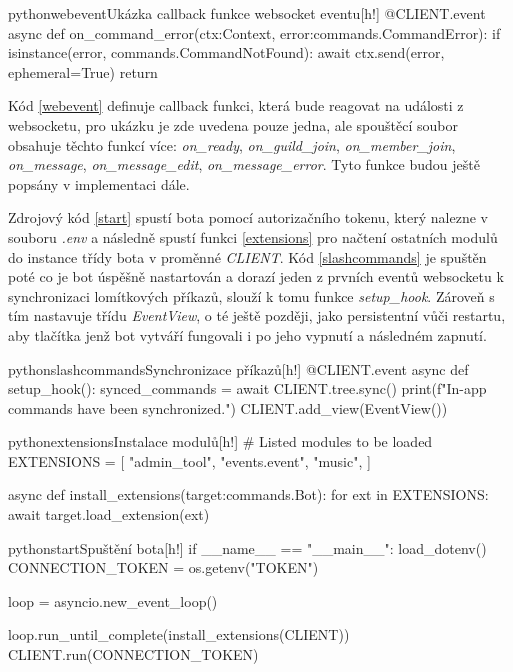 \documentclass[
  program=inf,
biblatex=false,
sourcecodes=true,
joinlists=true,
  figures=true,
  tables=true,
  glossaries=true,
  index=false
]{kidiplom}
\begin{document}
\begin{kicode}{python}{webevent}{Ukázka callback funkce websocket eventu}[h!]
  @CLIENT.event
  async def on_command_error(ctx:Context, error:commands.CommandError):
      if isinstance(error, commands.CommandNotFound):
          await ctx.send(error, ephemeral=True)
          return
\end{kicode}

Kód \ref{webevent} definuje callback funkci, která bude reagovat na události z websocketu, pro
ukázku je zde uvedena pouze jedna, ale spouštěcí soubor obsahuje těchto funkcí více:
{\it on\_ready}, {\it on\_guild\_join}, {\it on\_member\_join}, {\it on\_message}, {\it on\_message\_edit}, 
{\it on\_message\_error}. Tyto funkce budou ještě popsány v implementaci dále.

Zdrojový kód \ref{start} spustí bota pomocí autorizačního tokenu, který nalezne v 
souboru {\it .env} a následně spustí funkci \ref{extensions} pro načtení
ostatních modulů do instance třídy bota v proměnné {\it CLIENT}. Kód \ref{slashcommands} 
je spuštěn poté co je bot úspěšně nastartován a dorazí jeden z prvních eventů websocketu
k synchronizaci lomítkových příkazů, slouží k tomu funkce {\it setup\_hook}. Zároveň s tím
nastavuje třídu {\it EventView}, o té ještě později, jako persistentní vůči restartu, aby tlačítka
jenž bot vytváří fungovali i po jeho vypnutí a následném zapnutí.

\begin{kicode}{python}{slashcommands}{Synchronizace příkazů}[h!]
  @CLIENT.event
  async def setup_hook():
      synced_commands =  await CLIENT.tree.sync()
      print(f"In-app commands have been synchronized.")
      CLIENT.add_view(EventView())
\end{kicode}

\begin{kicode}{python}{extensions}{Instalace modulů}[h!]
  # Listed modules to be loaded
  EXTENSIONS = [
      "admin_tool",
      "events.event",
      "music",
  ]

  async def install_extensions(target:commands.Bot):
    for ext in EXTENSIONS:
        await target.load_extension(ext)
\end{kicode}

\begin{kicode}{python}{start}{Spuštění bota}[h!]
  if __name__ == "__main__":
    load_dotenv()
    CONNECTION_TOKEN = os.getenv("TOKEN")
    
    loop = asyncio.new_event_loop()
    
    loop.run_until_complete(install_extensions(CLIENT))
    CLIENT.run(CONNECTION_TOKEN)
\end{kicode}
\end{document}
